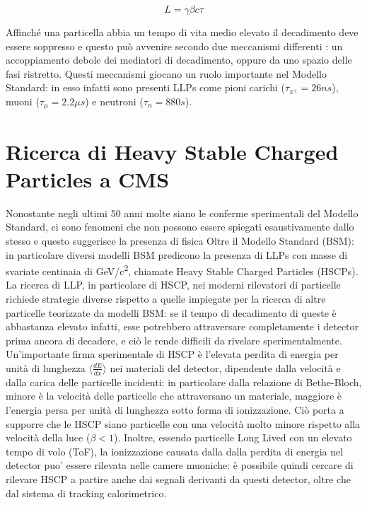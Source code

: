 \begin{equation}
  \label{eq:LorentzBoost}
  L = \gamma \beta c \tau
\end{equation}


Affinché una particella abbia un tempo di vita medio elevato il decadimento deve essere soppresso e questo può avvenire secondo due meccanismi differenti \cite{Genest:2022}: un accoppiamento debole dei mediatori di decadimento, oppure da uno spazio delle fasi ristretto. \newline
Questi meccanismi giocano un ruolo importante nel Modello Standard: in esso infatti sono presenti LLPs come pioni carichi ($\tau_{\pi^\pm} = 26\si{ns}$), muoni ($\tau_{\mu} = 2.2 \si{\mu s}$) e neutroni ($\tau_{n} = 880\si{s}$).

\newpage

\section{Ricerca di Heavy Stable Charged Particles a CMS}
\label{sec:NewPhysics}

Nonostante negli ultimi 50 anni molte siano le conferme sperimentali del Modello Standard, ci sono fenomeni che non possono essere spiegati esaustivamente dallo stesso e questo suggerisce la presenza di fisica Oltre il Modello Standard (BSM): in particolare diversi modelli BSM predicono la presenza di LLPs con masse di svariate centinaia di \si{GeV/c^2}, chiamate Heavy Stable Charged Particles (HSCPs). La ricerca di LLP, in particolare di HSCP, nei moderni rilevatori di particelle richiede strategie diverse rispetto a quelle impiegate per la ricerca di altre particelle teorizzate da modelli BSM: se il tempo di decadimento di queste è abbastanza elevato infatti, esse potrebbero attraversare completamente i detector prima ancora di decadere, e ciò le rende difficili da rivelare sperimentalmente. \newline 
Un'importante firma sperimentale di HSCP è l'elevata perdita di energia per unità di lunghezza $\langle \frac{dE}{dx}\rangle$ nei materiali del detector, dipendente dalla velocità e dalla carica delle particelle incidenti: in particolare dalla relazione di Bethe-Bloch, minore è la velocità delle particelle che attraversano un materiale, maggiore è l'energia persa per unità di lunghezza sotto forma di ionizzazione. Ciò porta a supporre che le HSCP siano particelle con una velocità molto minore rispetto alla velocità della luce ($\beta < 1$). Inoltre, essendo particelle Long Lived con un elevato tempo di volo (ToF), la ionizzazione causata dalla dalla perdita di energia nel detector puo' essere rilevata nelle camere muoniche: è possibile quindi cercare di rilevare HSCP a partire anche dai segnali derivanti da questi detector, oltre che dal sistema di tracking calorimetrico.


